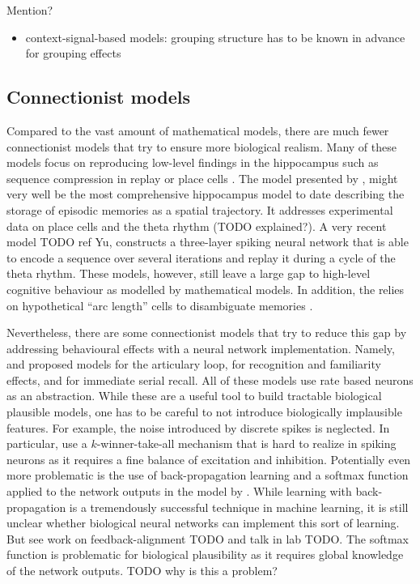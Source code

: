 Mention?
\begin{itemize}
    \item context-signal-based models: grouping structure has to be known in advance for grouping effects
\end{itemize}


\subsection{Connectionist models}
Compared to the vast amount of mathematical models, there are much fewer connectionist models that try to ensure more biological realism.
Many of these models focus on reproducing low-level findings in the hippocampus such as sequence compression in replay \parencite{Levy2005} or place cells \parencite{Milford2004}.
The model presented by \textcite{Hasselmo2012}, might very well be the most comprehensive hippocampus model to date describing the storage of episodic memories as a spatial trajectory.
It addresses experimental data on place cells and the theta rhythm (TODO explained?).
A very recent model TODO ref Yu, constructs a three-layer spiking neural network that is able to encode a sequence over several iterations and replay it during a cycle of the theta rhythm.
These models, however, still leave a large gap to high-level cognitive behaviour as modelled by mathematical models.
In addition, the \textcite{Hasselmo2012} relies on hypothetical ``arc length'' cells to disambiguate memories \parencite[cp.][]{Robins2014}.

Nevertheless, there are some connectionist models that try to reduce this gap by addressing behavioural effects with a neural network implementation.
Namely, \textcite{Burgess1992} and \textcite{Burgess1996} proposed models for the articulary loop, \textcite{Norman2003} for recognition and familiarity effects, and \textcite{Botvinick2006} for immediate serial recall.
All of these models use rate based neurons as an abstraction.
While these are a useful tool to build tractable biological plausible models, one has to be careful to not introduce biologically implausible features.
For example, the noise introduced by discrete spikes is neglected.
In particular, \textcite{Norman2003} use a $k$-winner-take-all mechanism that is hard to realize in spiking neurons as it requires a fine balance of excitation and inhibition.
Potentially even more problematic is the use of back-propagation learning and a softmax function applied to the network outputs in the model by \textcite{Botvinick2006}.
While learning with back-propagation is a tremendously successful technique in machine learning, it is still unclear whether biological neural networks can implement this sort of learning.
But see work on feedback-alignment TODO and talk in lab TODO\@.
The softmax function is problematic for biological plausibility as it requires global knowledge of the network outputs.
TODO why is this a problem?

